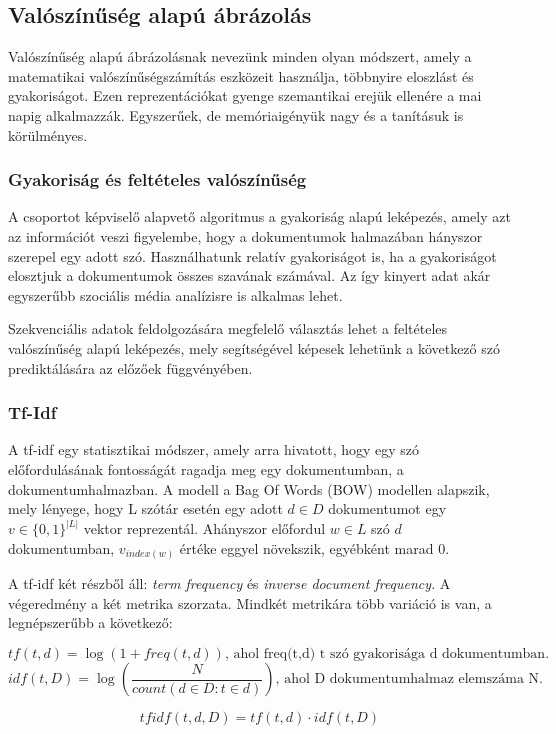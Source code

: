 \subsection{Valószínűség alapú ábrázolás}

Valószínűség alapú ábrázolásnak nevezünk minden olyan módszert, amely a matematikai valószínűségszámítás eszközeit használja, többnyire eloszlást és gyakoriságot. Ezen reprezentációkat gyenge szemantikai erejük ellenére a mai napig alkalmazzák. Egyszerűek, de memóriaigényük nagy és a tanításuk is körülményes.

\subsubsection{Gyakoriság és feltételes valószínűség}

A csoportot képviselő alapvető algoritmus a gyakoriság alapú leképezés, amely azt az információt veszi figyelembe, hogy a dokumentumok halmazában hányszor szerepel egy adott szó. Használhatunk relatív gyakoriságot is, ha a gyakoriságot elosztjuk a dokumentumok összes szavának számával. Az így kinyert adat akár egyszerűbb szociális média analízisre is alkalmas lehet.

Szekvenciális adatok feldolgozására megfelelő választás lehet a feltételes valószínűség alapú leképezés, mely segítségével képesek lehetünk a következő szó prediktálására az előzőek függvényében.


\subsubsection{Tf-Idf}

A tf-idf egy statisztikai módszer, amely arra hivatott, hogy egy szó előfordulásának fontosságát ragadja meg egy dokumentumban, a dokumentumhalmazban. A modell a Bag Of Words (BOW) modellen alapszik, mely lényege, hogy L szótár esetén egy adott $d \in D$ dokumentumot egy $v \in \{0,1\}^{|L|}$ vektor reprezentál. Ahányszor előfordul $w \in L$ szó $d$ dokumentumban, $v_{index(w)}$ értéke eggyel növekszik, egyébként marad 0. 

A tf-idf két részből áll: \textit{term frequency} és \textit{inverse document frequency}. A végeredmény a két metrika szorzata. Mindkét metrikára több variáció is van, a legnépszerűbb a következő:

\begin{definition}
$$tf\left(t,d\right) = \log \left( 1 + freq\left(t,d\right)\right) \text{, ahol freq(t,d) t szó gyakorisága d dokumentumban.}$$
$$idf\left(t,D\right) = \log \left( \frac{N}{count \left( d \in D:t \in d \right) } \right) \text{, ahol D dokumentumhalmaz elemszáma N.}$$

$$tfidf(t,d,D) = tf(t,d) \cdot idf(t,D)$$

\end{definition}


